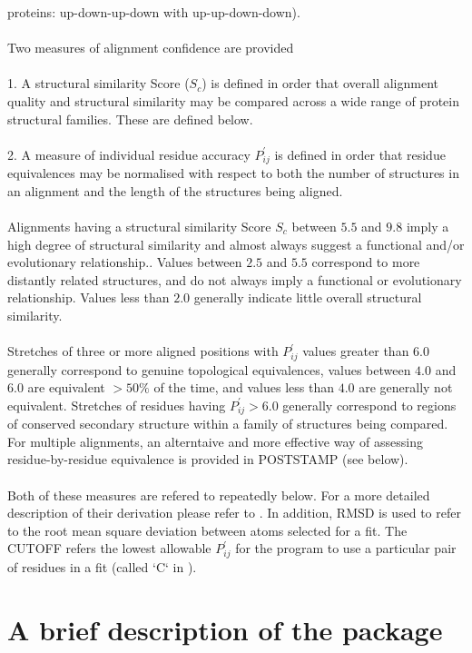 proteins: up-down-up-down with up-up-down-down).  \\
\\
Two measures of alignment confidence are provided \cite{rb92b}\\
\\
1. A structural similarity Score ($S_{c}$) is defined in order that
overall alignment quality and structural similarity may be compared
across a wide range of protein structural families.  These are defined below.\\
\\
2. A measure of individual residue accuracy $P_{ij}^{\prime}$ is 
defined in order that residue equivalences may be normalised with 
respect to both the number of structures in an alignment and the 
length of the structures being aligned.\\
\\
Alignments having a structural similarity Score $S_{c}$ between $5.5$ and
$9.8$ imply a high degree of structural similarity and almost always
suggest a functional and/or evolutionary relationship.. 
Values between $2.5$ and $5.5$ correspond to more distantly related
structures, and do not always imply a functional or evolutionary relationship.
Values less than $2.0$ generally indicate little overall structural similarity.\\
\\
Stretches of three or more aligned positions with $P_{ij}^{\prime}$ 
values greater than $6.0$ generally correspond to genuine topological 
equivalences, values between $4.0$ and $6.0$ are equivalent $> 50 \%$ of 
the time, and values less than $4.0$ are generally not equivalent.  
Stretches of residues having $P_{ij}^{\prime} > 6.0$ generally correspond to regions of 
conserved secondary structure within a family of structures being 
compared.  For multiple alignments, an alterntaive and more effective
way of assessing residue-by-residue equivalence is provided in POSTSTAMP (see below).\\
\\
Both of these measures are refered to repeatedly below.  For a more
detailed description of their derivation please refer to \cite{rb92b}.  
In addition, RMSD is used to refer to the root mean square 
deviation between atoms selected for a fit.  The CUTOFF refers the 
lowest allowable $P_{ij}^{\prime}$ for the program to use a particular 
pair of residues in a fit (called `C` in \cite{rb92b}).

\section{A brief description of the package}

